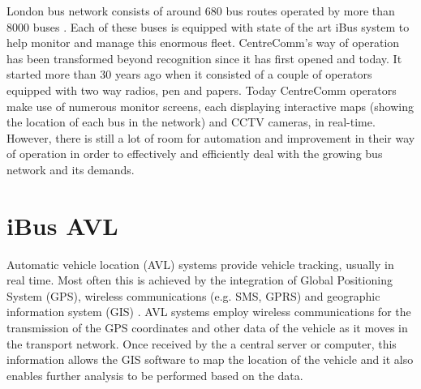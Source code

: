London bus network consists of around 680 bus routes operated by more than 8000 buses \cite{glads}. Each of these buses is equipped with state of the art iBus system to help monitor and manage this enormous fleet. CentreComm's way of operation has been transformed beyond recognition since it has first opened and today. It started more than 30 years ago \cite{centreComm} when it consisted of a couple of operators equipped with two way radios, pen and papers. Today CentreComm operators make use of numerous monitor screens, each displaying interactive maps (showing the location of each bus in the network) and CCTV cameras, in real-time. However, there is still a lot of room for automation and improvement in their way of operation in order to effectively and efficiently deal with the growing bus network and its demands.

\section{iBus AVL}
Automatic vehicle location (AVL) systems provide vehicle tracking, usually in real time. Most often this is achieved by the integration of Global Positioning System (GPS), wireless communications (e.g. SMS, GPRS) and geographic information system (GIS) \cite{riter1977automatic}. AVL systems employ wireless communications for the transmission of the GPS coordinates and other data of the vehicle as it moves in the transport network. Once received by the a central server or computer, this information allows the GIS software to map the location of the vehicle and it also enables further analysis to be performed based on the data.
 
